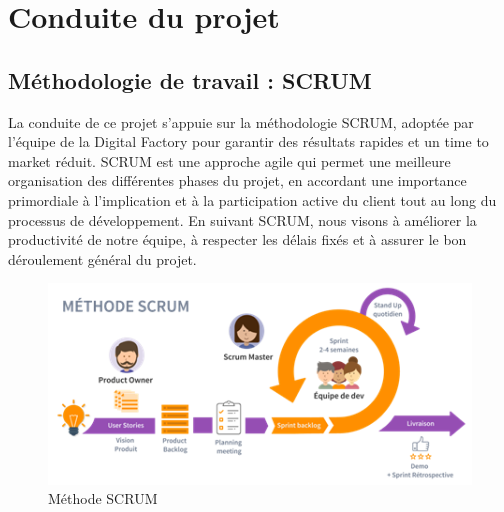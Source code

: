 \section{Conduite du projet}
\subsection{Méthodologie de travail : SCRUM}
La conduite de ce projet s'appuie sur la méthodologie SCRUM, adoptée par l'équipe de la Digital Factory pour garantir des résultats rapides et un time to market réduit. SCRUM est une approche agile qui permet une meilleure organisation des différentes phases du projet, en accordant une importance primordiale à l'implication et à la participation active du client tout au long du processus de développement. En suivant SCRUM, nous visons à améliorer la productivité de notre équipe, à respecter les délais fixés et à assurer le bon déroulement général du projet.

\begin{figure}[!h]
    \centering %
        \includegraphics[width=14cm]{images/conduite/SCRUM.png}
    \caption{Méthode SCRUM}
\end{figure}

